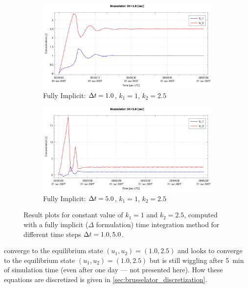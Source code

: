 \begin{figure}[H]
    \begin{subfigure}{0.5\textwidth}
        \includegraphics[width=\textwidth]{figures/brusselator_imp_dt=1d00.pdf}
        \caption{Fully Implicit: $\Delta t=1.0$, $k_1=1$, $k_2=2.5$}\label{fig:imp_dt=1d00}
    \end{subfigure}
    \begin{subfigure}{0.5\textwidth}
        \includegraphics[width=\textwidth]{figures/brusselator_imp_dt=5d00.pdf}
        \caption{Fully Implicit: $\Delta t=5.0$, $k_1=1$, $k_2=2.5$}\label{fig:imp_dt=5d00}
    \end{subfigure}
    \caption{Result plots for constant value of $k_1 = 1$ and $k_2 =2.5$, computed with a fully implicit ($\Delta$ formulation) time integration method for different time steps $\Delta t = 1.0, 5.0$.
    }
\end{figure}
 converge to the equilibrium state $(u_1, u_2) = (1.0, 2.5)$ and
 looks to converge to the equilibrium state $(u_1, u_2) = (1.0, 2.5)$ but is still wiggling after \SI{5}{\minute} of simulation time (even after one day --- not presented here).
How these equations are discretized is given in \autoref{sec:brusselator_discretization}.

